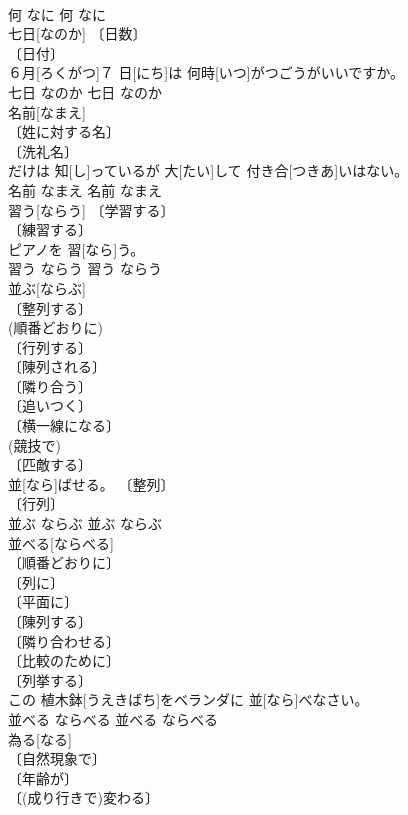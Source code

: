 \documentclass[8pt]{extreport}
\begin{document}
\begin{CJK}{UTF8}{min}
\\	何	なに	何	なに	
\\	七日[なのか]	〔日数〕 
\\	〔日付〕 
\\	６月[ろくがつ]７ 日[にち]は 何時[いつ]がつごうがいいですか。	
\\	七日	なのか	七日	なのか	
\\	名前[なまえ]	
\\	〔姓に対する名〕 
\\	〔洗礼名〕 
\\	[⇒な１ 
\\	名前[なまえ]だけは 知[し]っているが 大[たい]して 付き合[つきあ]いはない。	
\\	名前	なまえ	名前	なまえ	
\\	習う[ならう]	〔学習する〕 
\\	〔練習する〕 
\\	ピアノを 習[なら]う。	
\\	習う	ならう	習う	ならう	
\\	並ぶ[ならぶ]	
\\	〔整列する〕 
\\	(順番どおりに) 
\\	〔行列する〕 
\\	〔陳列される〕 
\\	〔隣り合う〕 
\\	〔追いつく〕 
\\	〔横一線になる〕 
\\	(競技で) 
\\	〔匹敵する〕 
\\	並[なら]ばせる。	〔整列〕 
\\	〔行列〕 
\\	並ぶ	ならぶ	並ぶ	ならぶ	
\\	並べる[ならべる]	
\\	〔順番どおりに〕 
\\	〔列に〕 
\\	〔平面に〕 
\\	〔陳列する〕 
\\	〔隣り合わせる〕 
\\	〔比較のために〕 
\\	〔列挙する〕 
\\	この 植木鉢[うえきばち]をベランダに 並[なら]べなさい。	
\\	並べる	ならべる	並べる	ならべる	
\\	為る[なる]	
\\	〔自然現象で〕 
\\	〔年齢が〕 
\\	〔(成り行きで)変わる〕 

\end{CJK}
\end{document}

